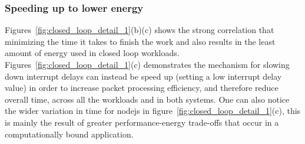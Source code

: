















\subsubsection{Speeding up to lower energy}
Figures~\ref{fig:closed_loop_detail_1}(b)(c) shows the strong correlation that minimizing the time it takes to finish the work and also results in the least amount of energy used in closed loop workloads. Figures~\ref{fig:closed_loop_detail_1}(c) demonstrates the mechanism for slowing down interrupt delays can instead be speed up (setting a low interrupt delay value) in order to increase packet processing efficiency, and therefore reduce overall time, across all the workloads and in both systems. One can also notice the wider variation in time for nodejs in figure~\ref{fig:closed_loop_detail_1}(c), this is mainly the result of greater performance-energy trade-offs that occur in a computationally bound application.

